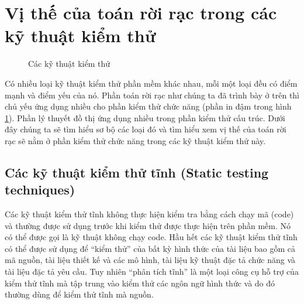 \documentclass[11pt,a4paper,oneside]{article}
\begin{document}
\section{Vị thế của toán rời rạc trong các kỹ thuật kiểm thử}
\begin{figure}
\setlength\fboxsep{1mm}
\setlength\fboxrule{1pt}
\begin{center}
\caption{Các kỹ thuật kiểm thử}
\label{fig:mtran_ima_cuoi}
\end{center}
\end{figure}
Có nhiều loại kỹ thuật kiểm thử phần mềm khác nhau, mỗi một loại đều có điểm mạnh và điểm yếu của nó. Phần toán rời rạc như chúng ta đã trình bày ở trên thì chủ yếu ứng dụng nhiều cho phần kiểm thử chức năng (phần in đậm trong hình \ref{fig:mtran_ima_cuoi}). Phần lý thuyết đồ thị ứng dụng nhiều trong phần kiểm thử cấu trúc. Dưới đây chúng ta sẽ tìm hiểu sơ bộ các loại đó và tìm hiểu xem vị thế của toán rời rạc sẽ nằm ở phần kiểm thử chức năng trong các kỹ thuật kiểm thử này.

\subsection {Các kỹ thuật kiểm thử tĩnh (Static testing techniques)}
Các kỹ thuật kiểm thử tĩnh không thực hiện kiểm tra bằng cách chạy mã (code) và thường được sử dụng trước khi kiểm thử được thực hiện trên phần mềm. Nó có thể được gọi là kỹ thuật không chạy code. Hầu hết các kỹ thuật kiểm thử tĩnh có thể được sử dụng để “kiểm thử” của bất kỳ hình thức của tài liệu bao gồm cả mã nguồn, tài liệu thiết kế và các mô hình, tài liệu kỹ thuật đặc tả chức năng và tài liệu đặc tả yêu cầu. Tuy nhiên  “phân tích tĩnh” là một loại công cụ hỗ trợ của kiểm thử tĩnh mà tập trung vào kiểm thử các ngôn ngữ hình thức và do đó thường dùng để kiểm thử tĩnh mà nguồn.
\end{document}
